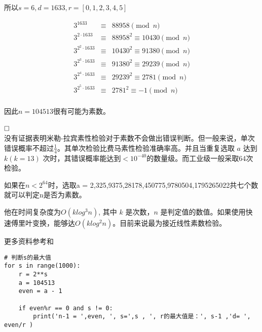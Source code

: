 \documentclass{article}
\begin{document}
所以$s=6,d = 1633,r = [0,1,2,3,4,5]$

\begin{eqnarray}   
\label{eq}
3^{1633} & \equiv & 88958  \pmod{n} \nonumber \\ 
3^{2 \cdot 1633} & \equiv& 88958^{2} \equiv 10430 \pmod{n}\nonumber \\ 
3^{2^{2} \cdot 1633} & \equiv& 10430^{2} \equiv 91380 \pmod{n} \nonumber \\ 
3^{2^{3} \cdot 1633} & \equiv& 91380^{2} \equiv 29239\pmod{n}\nonumber \\ 
3^{2^{4} \cdot 1633} & \equiv& 29239^{2} \equiv 2781 \pmod{n} \nonumber \\ 
3^{2^{5} \cdot 1633} & \equiv& 2781^{2} \equiv-1 \pmod{n}\nonumber \\ 
\nonumber 
\end{eqnarray}

因此$n = 104513$很有可能为素数。


$\hfill\square$
~\\

没有证据表明米勒-拉宾素性检验对于素数不会做出错误判断。但一般来说，单次错误概率不超过$\frac{1}{4}$。其单次检验比费马素性检验准确率高。并且当重复选取 $ a $ 达到 $k (k = 13) $ 次时，其错误概率能达到$ < 10^{-40}$的数量级。而工业级一般采取64次检验。

如果在$n < 2^{64}时$，选取a = 2,325,9375,28178,450775,9780504,1795265022共七个数就可以判定n是否为素数。

他在时间复杂度为$O(klog^{3}n)$,  其中 $k$ 是次数，$n$ 是判定值的数值。如果使用快速傅里叶变换，能够达$O(klog^{2}n)$。目前来说最为接近线性素数检验。

更多资料参考\href{http://home.sandiego.edu/~dhoffoss/teaching/cryptography/10-Rabin-Miller.pdf}{\color{blue}{资料1}}和 \href{http://staff.ustc.edu.cn/~lvmin05/jssl/chap8-\%CB\%D8\%D0\%D4\%BC\%EC\%B2\%E2.pdf}{\color{blue}{资料2}}


\begin{lstlisting}
# 判断s的最大值
for s in range(1000):
    r = 2**s
    a = 104513	 
    even = a - 1
    
    if even%r == 0 and s != 0:
        print('n-1 = ',even, ', s=',s , ', r的最大值是：', s-1 ,'d= ', even/r )
\end{lstlisting}
\end{document}
